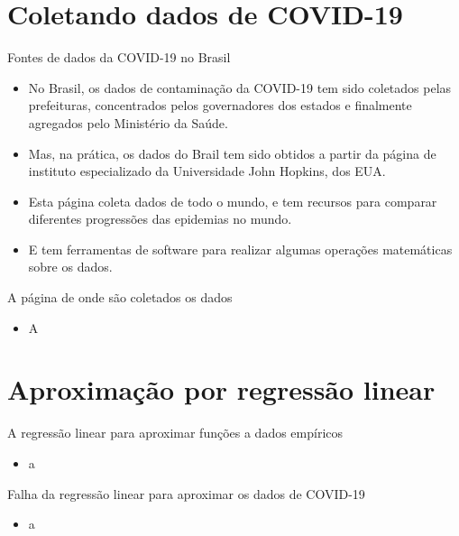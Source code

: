 \documentclass[a4paper,10pt]{beamer}
\begin{document}
\section{Coletando dados de COVID-19}

\begin{frame}{Fontes de dados da COVID-19 no Brasil}
    \begin{itemize}
	\item No Brasil, os dados de contaminação da COVID-19 tem sido coletados
	    pelas prefeituras, concentrados pelos governadores dos estados 
	    e finalmente agregados pelo Ministério da Saúde.
	\item Mas, na prática, os dados do Brail tem sido obtidos a partir da 
	    página de instituto especializado da Universidade John Hopkins, 
 	    dos EUA.
	\item Esta página coleta dados de todo o mundo, e tem recursos para
	    comparar diferentes progressões das epidemias no mundo.
	 \item E tem ferramentas de software para realizar algumas operações 
	     matemáticas sobre os dados.
    \end{itemize}

\end{frame}


\begin{frame}{A página de onde são coletados os dados}
  \begin{itemize}
      \item A
  \end{itemize}

\end{frame}

\section{Aproximação por regressão linear}

\begin{frame}{A regressão linear para aproximar funções a dados empíricos}
    \begin{itemize}
	\item a
    \end{itemize}

\end{frame}

\begin{frame}{Falha da regressão linear para aproximar os dados de COVID-19}
    \begin{itemize}
	\item a
    \end{itemize}

\end{frame}
\end{document}
